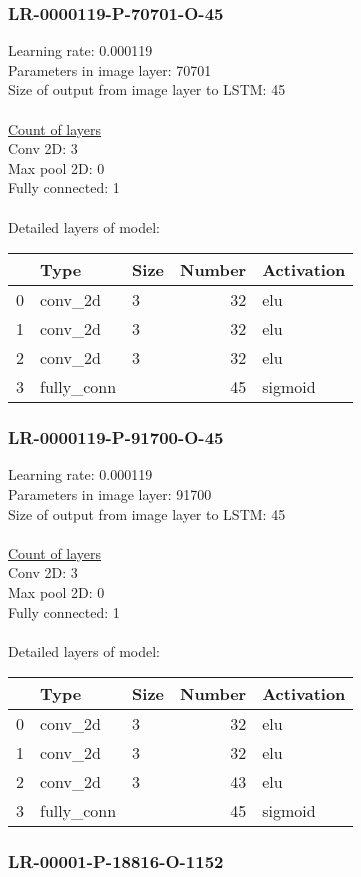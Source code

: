 \subsubsection*{LR-0000119-P-70701-O-45}
Learning rate: 0.000119
\\Parameters in image layer: 70701
\\Size of output from image layer to LSTM: 45
\\\\\underline{Count of layers} 
\\Conv 2D:           3\\Max pool 2D:      0\\Fully connected:  1
\\\\Detailed layers of model: \\\begin{tabular}{rllrl}
\hline
    & Type       & Size   &   Number & Activation   \\
\hline
  0 & conv\_2d    & 3      &       32 & elu          \\
  1 & conv\_2d    & 3      &       32 & elu          \\
  2 & conv\_2d    & 3      &       32 & elu          \\
  3 & fully\_conn &        &       45 & sigmoid      \\
\hline
\end{tabular}\subsubsection*{LR-0000119-P-91700-O-45}
Learning rate: 0.000119
\\Parameters in image layer: 91700
\\Size of output from image layer to LSTM: 45
\\\\\underline{Count of layers} 
\\Conv 2D:           3\\Max pool 2D:      0\\Fully connected:  1
\\\\Detailed layers of model: \\\begin{tabular}{rllrl}
\hline
    & Type       & Size   &   Number & Activation   \\
\hline
  0 & conv\_2d    & 3      &       32 & elu          \\
  1 & conv\_2d    & 3      &       32 & elu          \\
  2 & conv\_2d    & 3      &       43 & elu          \\
  3 & fully\_conn &        &       45 & sigmoid      \\
\hline
\end{tabular}\subsubsection*{LR-00001-P-18816-O-1152}
